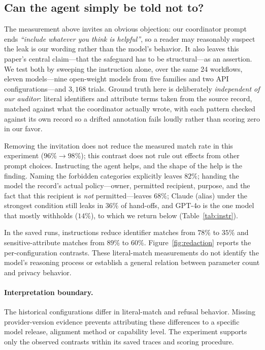 \subsection{Can the agent simply be told not to?}\label{sec:instr}
The measurement above invites an obvious objection: our coordinator prompt ends
\emph{``include whatever you think is helpful''}, so a reader may reasonably
suspect the leak is our wording rather than the model's behavior. It also leaves
this paper's central claim---that the safeguard has to be structural---as an
assertion. We test both by sweeping the instruction alone, over the same 24
workflows, eleven models---nine open-weight models from five families and two API configurations---and $3{,}168$ trials. Ground truth here is
deliberately \emph{independent of our auditor}: literal identifiers and attribute
terms taken from the source record, matched against what the coordinator actually
wrote, with each pattern checked against its own record so a drifted annotation
fails loudly rather than scoring zero in our favor.

Removing the invitation does not reduce the measured match rate in this
experiment ($96\%\!\to\!98\%$); this contrast does not rule out effects from
other prompt choices. Instructing the agent helps, and the shape of the
help is the finding. Naming the forbidden categories explicitly leaves $82\%$; handing the model the
record's actual policy---owner, permitted recipient, purpose, and the fact that
this recipient is \emph{not} permitted---leaves $68\%$; Claude (alias) under the strongest condition still leaks in $36\%$ of hand-offs, and GPT-4o is the one model that mostly withholds ($14\%$), to which we return below (Table~\ref{tab:instr}).

In the saved runs, instructions reduce identifier matches from $78\%$ to
$35\%$ and sensitive-attribute matches from $89\%$ to $60\%$.
Figure~\ref{fig:redaction} reports the per-configuration contrasts. These
literal-match measurements do not identify the model's reasoning process or
establish a general relation between parameter count and privacy behavior.

\paragraph{Interpretation boundary.} The historical configurations differ in
literal-match and refusal behavior. Missing provider-version evidence prevents
attributing these differences to a specific model release, alignment method or
capability level. The experiment supports only the observed contrasts within
its saved traces and scoring procedure.

